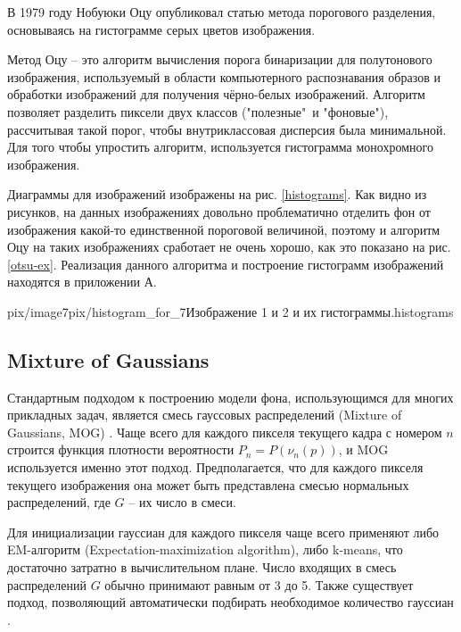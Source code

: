 В 1979 году Нобуюки Оцу опубликовал статью \cite{otsu} метода порогового 
разделения, основываясь на гистограмме серых цветов изображения. 

Метод Оцу -- это алгоритм вычисления порога бинаризации для полутонового
изображения, используемый в области компьютерного распознавания образов
и обработки изображений для получения чёрно-белых изображений. Алгоритм
позволяет разделить пиксели двух классов ("полезные"\ и "фоновые"), 
рассчитывая такой порог, чтобы внутриклассовая дисперсия была
минимальной. Для того чтобы упростить алгоритм, используется
гистограмма монохромного изображения.
 
Диаграммы для изображений изображены на рис. \ref{histograms}. 
Как видно из рисунков, на данных изображениях довольно
проблематично отделить фон от изображения какой-то единственной 
пороговой величиной, поэтому и алгоритм Оцу на таких изображениях 
сработает не очень хорошо, как это показано на рис. \ref{otsu-ex}. 
Реализация данного алгоритма и построение гистограмм изображений
находятся в приложении А.

{pix/image7}{pix/histogram_for_7}{Изображение 1 и 2
и их гистограммы.}{histograms}

\newpage


\subsection{Mixture of Gaussians}

Стандартным подходом к построению модели фона, использующимся для многих
прикладных задач, является смесь гауссовых распределений (Mixture of Gaussians,
MOG) \cite{MOG-1, MOG-2}. Чаще всего для каждого пикселя
текущего кадра с номером $n$ строится функция плотности вероятности 
$P_n=P(\nu_n(p))$, и MOG используется именно этот подход. Предполагается, что 
для каждого пикселя текущего изображения она может быть представлена смесью
нормальных распределений, где $G$ -- их число в смеси.

Для инициализации гауссиан для каждого пикселя чаще всего применяют либо
EM-алгоритм (Expectation-maximization algorithm), либо k-means, что
достаточно затратно в вычислительном плане. Число входящих в смесь распределений
$G$ обычно принимают равным от 3 до 5. Также существует подход, позволяющий
автоматически подбирать необходимое количество гауссиан \cite{MOG-2}. 

